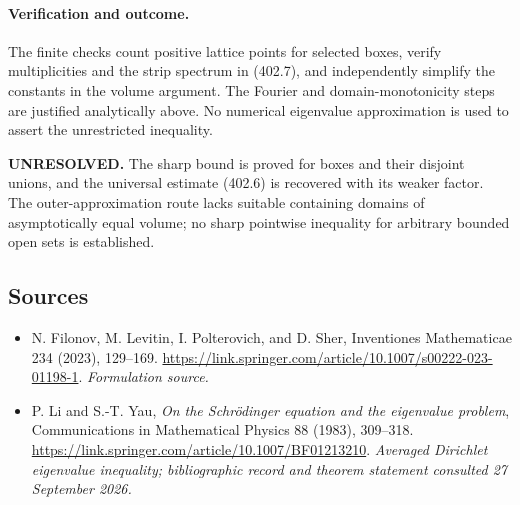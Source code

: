 \documentclass[11pt]{article}
\begin{document}
\paragraph{Verification and outcome.}
The finite checks count positive lattice points for selected boxes, verify multiplicities and the strip spectrum in (402.7), and independently simplify the constants in the volume argument. The Fourier and domain-monotonicity steps are justified analytically above. No numerical eigenvalue approximation is used to assert the unrestricted inequality.

\textbf{UNRESOLVED.} The sharp bound is proved for boxes and their disjoint unions, and the universal estimate (402.6) is recovered with its weaker factor. The outer-approximation route lacks suitable containing domains of asymptotically equal volume; no sharp pointwise inequality for arbitrary bounded open sets is established.

\subsection{Sources}
\begin{itemize}
\item[S1]N. Filonov, M. Levitin, I. Polterovich, and D. Sher, Inventiones Mathematicae 234 (2023), 129–169.
\url{https://link.springer.com/article/10.1007/s00222-023-01198-1}.
\textit{Formulation source.}
\item[E1]P. Li and S.-T. Yau, \emph{On the Schr\"odinger equation and the eigenvalue problem}, Communications in Mathematical Physics 88 (1983), 309--318.
\url{https://link.springer.com/article/10.1007/BF01213210}.
\textit{Averaged Dirichlet eigenvalue inequality; bibliographic record and theorem statement consulted 27 September 2026.}
\end{itemize}
\end{document}
